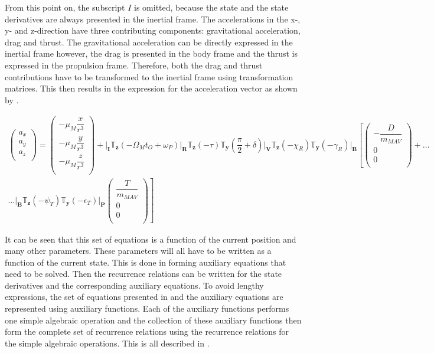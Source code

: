 From this point on, the subscript $I$ is omitted, because the state and the state derivatives are always presented in the inertial frame. The accelerations in the x-, y- and z-direction have three contributing components: gravitational acceleration, drag and thrust. The gravitational acceleration can be directly expressed in the inertial frame however, the drag is presented in the body frame and the thrust is expressed in the propulsion frame. Therefore, both the drag and thrust contributions have to be transformed to the inertial frame using transformation matrices. This then results in the expression for the acceleration vector as shown by .

\begin{multline} \label{eq:acc}
\begin{pmatrix}
a_{x}\\
a_{y}\\
a_{z}\\
\end{pmatrix}
=
\begin{pmatrix}
-\mu_{M}\dfrac{x}{r^{3}}\\
-\mu_{M}\dfrac{y}{r^{3}}\\
-\mu_{M}\dfrac{z}{r^{3}}\\
\end{pmatrix}+
\Bigg|_{\mathbf{I}}\mathbb{T}_{\mathbf{z}}\left(-\Omega_{M}t_{O}+\omega_{P}\right)\Bigg|_{\mathbf{R}}\mathbb{T}_{\mathbf{z}}\left(-\tau\right)\mathbb{T}_{\mathbf{y}}\left(\dfrac{\pi}{2}+\delta\right)\Bigg|_{\mathbf{V}}\mathbb{T}_{\mathbf{z}}\left(-\chi_{R}\right)\mathbb{T}_{\mathbf{y}}\left(-\gamma_{R}\right)\Bigg|_{\mathbf{B}}\left[
\begin{pmatrix}
-\dfrac{D}{m_{MAV}}\\
0\\
0\\
\end{pmatrix}
+  \right. \dots \\
\dotsc
 \left.
\Bigg|_{\mathbf{B}}\mathbb{T}_{\mathbf{z}}\left(-\psi_{T}\right)\mathbb{T}_{\mathbf{y}}\left(-\epsilon_{T}\right)\Bigg|_{\mathbf{P}}
\begin{pmatrix}
\dfrac{T}{m_{MAV}}\\
0\\
0\\
\end{pmatrix}
\right]
\end{multline}

It can be seen that this set of equations is a function of the current position and many other parameters. These parameters will all have to be written as a function of the current state. This is done in  forming auxiliary equations that need to be solved. Then the recurrence relations can be written for the state derivatives and the corresponding auxiliary equations. To avoid lengthy expressions, the set of equations presented in  and the auxiliary equations are represented using auxiliary functions. Each of the auxiliary functions performs one simple algebraic operation and the collection of these auxiliary functions then form the complete set of recurrence relations using the recurrence relations for the simple algebraic operations. This is all described in . 


